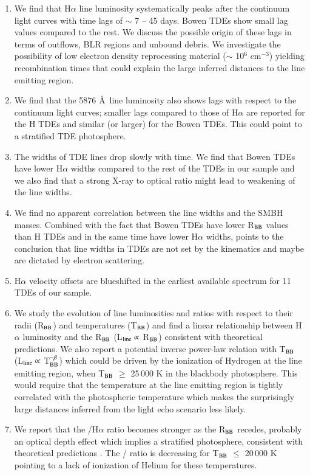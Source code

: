 \documentclass[structabstract]{aa}
\begin{document}
\begin{enumerate}[label={\arabic*.}]
\item We find that H$\alpha$ line luminosity systematically peaks after the continuum light curves with time lags of $\sim$ 7 -- 45 days.  Bowen TDEs show small lag values compared to the rest. We discuss the possible origin of these lags in terms of outflows, BLR regions and unbound debris. We investigate the possibility of low electron density reprocessing material ($\sim$ 10$^{6}$ cm$^{-3}$) yielding recombination times that could explain the large inferred distances to the line emitting region.
\item We find that the  5876 \AA\, line luminosity also shows lags with respect to the continuum light curves; smaller lags compared to those of H$\alpha$ are reported for the H TDEs and similar (or larger) for the  Bowen TDEs. This could point to a stratified TDE photosphere.
\item The widths of TDE lines drop slowly with time. We find that  Bowen TDEs have lower H$\alpha$ widths compared to the rest of the TDEs in our sample and we also find that a strong X-ray to optical ratio might lead to weakening of the line widths.
\item We find no apparent correlation between the line widths and the SMBH masses. Combined with the fact that  Bowen TDEs have lower R$_{\rm BB}$ values than H TDEs and in the same time have lower H$\alpha$ widths, points to the conclusion that line widths in TDEs are not set by the kinematics and maybe are dictated by electron scattering. 
\item H$\alpha$ velocity offsets are blueshifted in the earliest available spectrum for 11 TDEs of our sample.
\item We study the evolution of line luminosities and ratios with respect to their radii (R$_{\rm BB}$) and temperatures (T$_{\rm BB}$) and find a linear relationship between H$\alpha$ luminosity and the R$_{\rm BB}$ (L$_{\rm line} \propto$ R$_{\rm BB}$) consistent with theoretical predictions. We also report a potential inverse power-law relation with T$_{\rm BB}$ (L$_{\rm line} \propto$ T$_{\rm BB}^{-\beta}$) which could be driven by the ionization of Hydrogen at the line emitting region, when T$_{\rm BB}$ $\geq$ 25\,000 K in the blackbody photosphere. This would require that the temperature at the line emitting region is tightly correlated with the photospheric temperature which makes the surprisingly large distances inferred from the light echo scenario less likely.
\item We report that the /H$\alpha$ ratio becomes stronger as the R$_{\rm BB}$ recedes, probably an optical depth effect which implies a stratified photosphere, consistent with theoretical predictions \citep{Roth2016}. The / ratio is decreasing for T$_{\rm BB}$ $\leq$ 20\,000 K pointing to a lack of ionization of Helium for these temperatures.

\end{enumerate}
\end{document}
